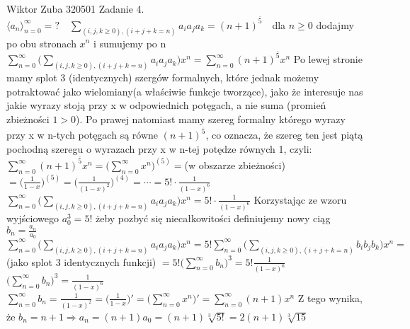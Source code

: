 \documentclass{article}
\begin{document}
Wiktor Zuba 320501
\newline
Zadanie 4.
\newline
\newline
$
\langle a_n \rangle_{n=0}^{\infty}=?\quad \sum\limits_{(i,j,k\ge0),(i+j+k=n)}a_ia_ja_k=(n+1)^{\overline{5}}\quad $dla $n\ge0
$\newline\newline
dodajmy po obu stronach $x^n$ i sumujemy po n\newline
$
\sum\limits_{n=0}^{\infty}\bigl(\sum\limits_{(i,j,k\ge0),(i+j+k=n)}a_ia_ja_k\bigr)x^n=\sum\limits_{n=0}^{\infty}(n+1)^{\overline{5}}x^n
$\newline
Po lewej stronie mamy splot 3 (identycznych) szergów formalnych, które jednak możemy potraktować jako wielomiany(a właściwie funkcje tworzące),
jako że interesuje nas jakie wyrazy stoją przy
x w odpowiednich potęgach, a nie suma (promień zbieżności $1>0$).\newline
Po prawej natomiast mamy szereg formalny którego wyrazy przy x w n-tych potęgach są równe $(n+1)^{\overline{5}}$,
co oznacza, że szereg ten jest piątą pochodną szeregu o wyrazach przy x w n-tej potędze równych 1, czyli:\newline
$
\sum\limits_{n=0}^{\infty}(n+1)^{\overline{5}}x^n
=
\bigl(\sum\limits_{n=0}^{\infty}x^n\bigr)^{(5)}
=$(w obszarze zbieżności)$=
\bigl(\frac{1}{1-x}\bigr)^{(5)}
=
\bigl(\frac{1}{(1-x)^2}\bigr)^{(4)}
=\cdots=
5!\cdot\frac{1}{(1-x)^6}
$\newline
$
\sum\limits_{n=0}^{\infty}\bigl(\sum\limits_{(i,j,k\ge0),(i+j+k=n)}a_ia_ja_k\bigr)x^n=5!\cdot\frac{1}{(1-x)^6}
$\newline
Korzystając ze wzoru wyjściowego $a_0^3=5!$
żeby pozbyć się niecałkowitości definiujemy nowy ciąg $b_n=\frac{a_n}{a_0}$\newline
$
\sum\limits_{n=0}^{\infty}\bigl(\sum\limits_{(i,j,k\ge0),(i+j+k=n)}a_ia_ja_k\bigr)x^n
=
5!\sum\limits_{n=0}^{\infty}\bigl(\sum\limits_{(i,j,k\ge0),(i+j+k=n)}b_ib_jb_k\bigr)x^n
=
$\newline
(jako splot 3 identycznych funkcji)
$
=
5!\bigl(\sum\limits_{n=0}^{\infty}b_n\bigr)^3
=
5!\frac{1}{(1-x)^6}
$\quad\quad\quad
$
\bigl(\sum\limits_{n=0}^{\infty}b_n\bigr)^3=\frac{1}{(1-x)^6}
$\newline
$
\sum\limits_{n=0}^{\infty}b_n=\frac{1}{(1-x)^2}=\bigl(\frac{1}{1-x}\bigr)'=\bigl(\sum\limits_{n=0}^{\infty}x^n\bigr)'=\sum\limits_{n=0}^{\infty}(n+1)x^n
$\newline
Z tego wynika, że $b_n=n+1\Rightarrow a_n=(n+1)a_0=(n+1)\sqrt[3]{5!}=2(n+1)\sqrt[3]{15}$
\end{document}
